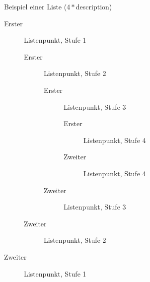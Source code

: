 \documentclass[%
,full
,color
,Ausgabe=4
]{dtk2}
\begin{document}
Beispiel einer Liste ($4*$description)

\begin{description}
  \item[Erster] Listenpunkt, Stufe 1
  \begin{description}
    \item[Erster] Listenpunkt, Stufe 2
    \begin{description}
      \item[Erster] Listenpunkt, Stufe 3
      \begin{description}
        \item[Erster] Listenpunkt, Stufe 4
        \item[Zweiter] Listenpunkt, Stufe 4
      \end{description}
      \item[Zweiter] Listenpunkt, Stufe 3
    \end{description}
    \item[Zweiter] Listenpunkt, Stufe 2
  \end{description}
  \item[Zweiter] Listenpunkt, Stufe 1
\end{description}
\end{document}
